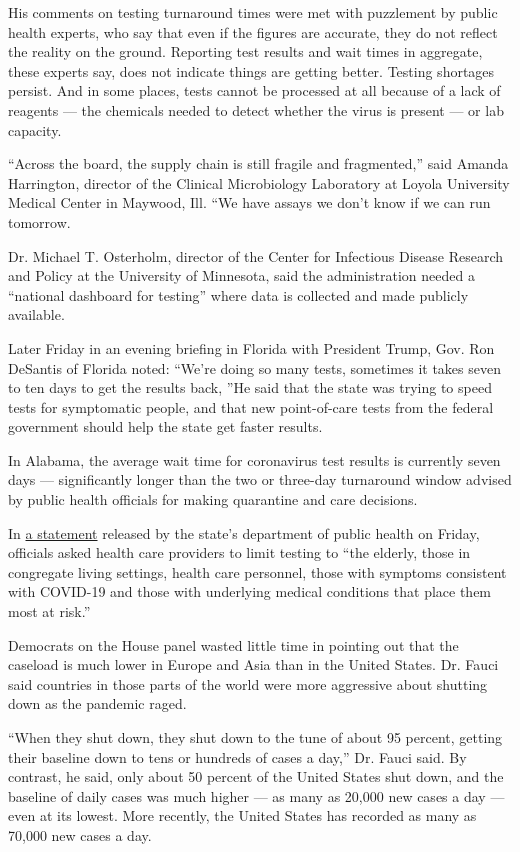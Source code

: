 His comments on testing turnaround times were met with puzzlement by
public health experts, who say that even if the figures are accurate,
they do not reflect the reality on the ground. Reporting test results
and wait times in aggregate, these experts say, does not indicate things
are getting better. Testing shortages persist. And in some places, tests
cannot be processed at all because of a lack of reagents --- the
chemicals needed to detect whether the virus is present --- or lab
capacity.

``Across the board, the supply chain is still fragile and fragmented,''
said Amanda Harrington, director of the Clinical Microbiology Laboratory
at Loyola University Medical Center in Maywood, Ill. ``We have assays we
don't know if we can run tomorrow.

Dr. Michael T. Osterholm, director of the Center for Infectious Disease
Research and Policy at the University of Minnesota, said the
administration needed a ``national dashboard for testing'' where data is
collected and made publicly available.

Later Friday in an evening briefing in Florida with President Trump,
Gov. Ron DeSantis of Florida noted: ``We're doing so many tests,
sometimes it takes seven to ten days to get the results back, ''He said
that the state was trying to speed tests for symptomatic people, and
that new point-of-care tests from the federal government should help the
state get faster results.

In Alabama, the average wait time for coronavirus test results is
currently seven days --- significantly longer than the two or three-day
turnaround window advised by public health officials for making
quarantine and care decisions.

In \href{https://www.alabamapublichealth.gov/news/2020/07/31e.html}{a
statement} released by the state's department of public health on
Friday, officials asked health care providers to limit testing to ``the
elderly, those in congregate living settings, health care personnel,
those with symptoms consistent with COVID-19 and those with underlying
medical conditions that place them most at risk.''

Democrats on the House panel wasted little time in pointing out that the
caseload is much lower in Europe and Asia than in the United States. Dr.
Fauci said countries in those parts of the world were more aggressive
about shutting down as the pandemic raged.

``When they shut down, they shut down to the tune of about 95 percent,
getting their baseline down to tens or hundreds of cases a day,'' Dr.
Fauci said. By contrast, he said, only about 50 percent of the United
States shut down, and the baseline of daily cases was much higher --- as
many as 20,000 new cases a day --- even at its lowest. More recently,
the United States has recorded as many as 70,000 new cases a day.

